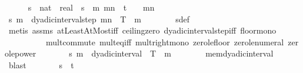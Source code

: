 \begin{isabellebody}
\ \ \ \ \isamarkupfalse%
\ s\ {\isacharcolon}{\kern0pt}{\isacharcolon}{\kern0pt}\ {\isachardoublequoteopen}nat\ {\isasymRightarrow}\ real{\isachardoublequoteclose}\ \ {\isachardoublequoteopen}s\ {\isasymequiv}\ {\isasymlambda}m{\isachardot}{\kern0pt}\ {\isasymlfloor}{}{\isacharcircum}{\kern0pt}{\isacharparenleft}{\kern0pt}m{\isacharplus}{\kern0pt}n{\isacharparenright}{\kern0pt}\ {\isacharasterisk}{\kern0pt}\ t{\isasymrfloor}\ {\isacharslash}{\kern0pt}\ {}\ {\isacharcircum}{\kern0pt}\ {\isacharparenleft}{\kern0pt}m{\isacharplus}{\kern0pt}n{\isacharparenright}{\kern0pt}{\isachardoublequoteclose}\isanewline
\ \ \ \ \isamarkupfalse%
\ {\isachardoublequoteopen}s\ m\ {\isasymin}\ dyadic{\isacharunderscore}{\kern0pt}interval{\isacharunderscore}{\kern0pt}step\ {\isacharparenleft}{\kern0pt}m{\isacharplus}{\kern0pt}n{\isacharparenright}{\kern0pt}\ {}\ T{\isachardoublequoteclose}\ \ m\isanewline
\ \ \ \ \ \ \isamarkupfalse%
\ s{\isacharunderscore}{\kern0pt}def\isanewline
\ \ \ \ \ \ \isamarkupfalse%
\ {\isacharparenleft}{\kern0pt}metis\ assms{\isacharparenleft}{\kern0pt}{}{\isacharparenright}{\kern0pt}\ atLeastAtMost{\isacharunderscore}{\kern0pt}iff\ ceiling{\isacharunderscore}{\kern0pt}zero\ dyadic{\isacharunderscore}{\kern0pt}interval{\isacharunderscore}{\kern0pt}step{\isacharunderscore}{\kern0pt}iff\ floor{\isacharunderscore}{\kern0pt}mono\ \isanewline
\ \ \ \ \ \ \ \ \ \ mult{\isachardot}{\kern0pt}commute\ mult{\isacharunderscore}{\kern0pt}eq{\isacharunderscore}{\kern0pt}{}{\isacharunderscore}{\kern0pt}iff\ mult{\isacharunderscore}{\kern0pt}right{\isacharunderscore}{\kern0pt}mono\ zero{\isacharunderscore}{\kern0pt}le{\isacharunderscore}{\kern0pt}floor\ zero{\isacharunderscore}{\kern0pt}le{\isacharunderscore}{\kern0pt}numeral\ zero{\isacharunderscore}{\kern0pt}le{\isacharunderscore}{\kern0pt}power{\isacharparenright}{\kern0pt}\isanewline
\ \ \ \ \isamarkupfalse%
\ \isamarkupfalse%
\ {\isachardoublequoteopen}s\ m\ {\isasymin}\ dyadic{\isacharunderscore}{\kern0pt}interval\ {}\ T{\isachardoublequoteclose}\ \ m\isanewline
\ \ \ \ \ \ \isamarkupfalse%
\ mem{\isacharunderscore}{\kern0pt}dyadic{\isacharunderscore}{\kern0pt}interval\ \isamarkupfalse%
\ blast\isanewline
\ \ \ \ \isamarkupfalse%
\ \isamarkupfalse%
\ {\isachardoublequoteopen}s\ {\isasymlonglonglongrightarrow}\ t{\isachardoublequoteclose}\isanewline

\end{isabellebody}
